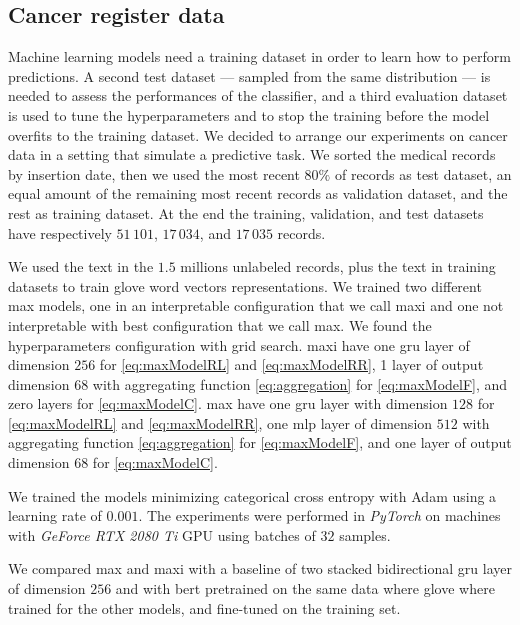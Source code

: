 \subsection{Cancer register data}
Machine learning models need a training dataset in order to learn how
to perform predictions. A second test dataset — sampled from the same
distribution — is needed to assess the performances of the
classifier, and a third evaluation dataset is used to tune the
hyperparameters and to stop the training before the model overfits to
the training dataset. We decided to arrange our experiments on cancer
data in 
a setting that simulate a predictive task. We sorted the medical
records by insertion date, then we used the most recent $80\%$ of
records as test 
dataset, an equal amount of the remaining most recent records as
validation dataset, and the rest as training dataset. At the end the
training, validation, and test datasets have respectively $51\,101$,
$17\,034$, and $17\,035$ records.

We used the text in the $1.5$ millions unlabeled records, plus the
text in training datasets to train \ac{glove} word
vectors representations. We trained two different \ac{max} models, one
in an interpretable configuration that we call \ac{maxi} and one not
interpretable with 
best configuration that we call \ac{max}. We found the hyperparameters
configuration with grid search. 
\ac{maxi} have one \ac{gru} layer of dimension $256$
for \eqref{eq:maxModelRL} and \eqref{eq:maxModelRR}, 1 layer of
output dimension $68$ with aggregating function \eqref{eq:aggregation}
for \eqref{eq:maxModelF}, and zero layers for \eqref{eq:maxModelC}. 
\ac{max} have
one \ac{gru} layer with
dimension $128$ for \eqref{eq:maxModelRL} and \eqref{eq:maxModelRR},
one \ac{mlp} layer of dimension $512$ with aggregating function
\eqref{eq:aggregation} for \eqref{eq:maxModelF}, and
one layer of output dimension $68$ for \eqref{eq:maxModelC}.

We trained the models minimizing categorical cross entropy with Adam
\cite{kingma2014adam} using a learning rate of $0.001$. The
experiments were performed in \emph{PyTorch} on machines with
\emph{GeForce RTX 2080 Ti} 
GPU using batches of $32$ samples.

We compared \ac{max} and \ac{maxi} with a baseline of two stacked
bidirectional 
\ac{gru} layer of dimension $256$ and with \ac{bert} pretrained on the
same data where \ac{glove} where trained for the other models, and
fine-tuned on the training set.

